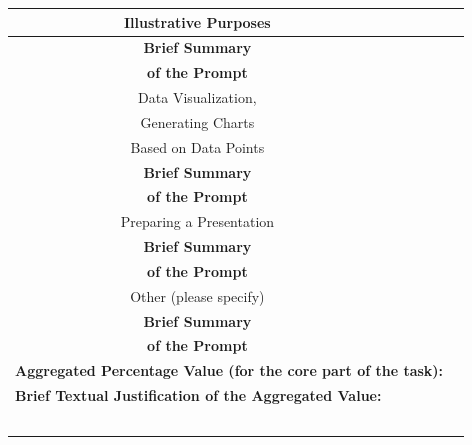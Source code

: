 {\begin{tabular}{|c|c|c|c|}
		Illustrative Purposes & & & \\ \hline
		\textbf{Brief Summary}  &\multicolumn{3}{|l|}{} \\
		\textbf{of the Prompt}  &\multicolumn{3}{|l|}{} \\ \hline \hline
		Data Visualization,  & & & \\
		Generating Charts & & & \\
		Based on Data Points & & & \\ \hline
		\textbf{Brief Summary}  &\multicolumn{3}{|l|}{} \\
		\textbf{of the Prompt}  &\multicolumn{3}{|l|}{} \\ \hline \hline
		Preparing a Presentation & & & \\ \hline
		\textbf{Brief Summary}  &\multicolumn{3}{|l|}{} \\
		\textbf{of the Prompt}  &\multicolumn{3}{|l|}{} \\ \hline \hline
		Other (please specify) & & & \\ \hline
		\textbf{Brief Summary}  &\multicolumn{3}{|l|}{} \\
		\textbf{of the Prompt}  &\multicolumn{3}{|l|}{} \\ \hline \hline
		\multicolumn{3}{|l|}{\textbf{Aggregated Percentage Value (for the core part of the task):}} & \\ \hline
		\multicolumn{4}{|l|}{\textbf{Brief Textual Justification of the Aggregated Value:}} \\ 
		\multicolumn{4}{|l|}{} \\ 
		\multicolumn{4}{|l|}{} \\
		\multicolumn{4}{|l|}{} \\
		\multicolumn{4}{|l|}{} \\
		\multicolumn{4}{|l|}{} \\ \hline
		
	\end{tabular}
} %


